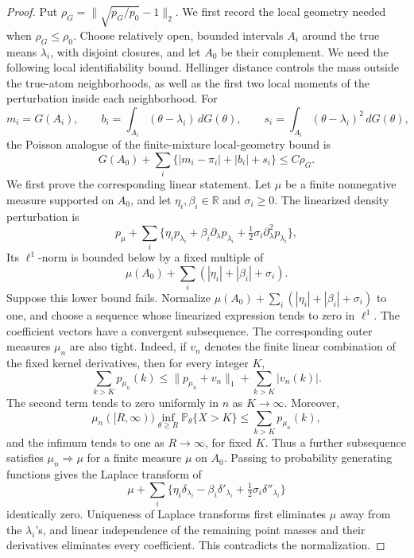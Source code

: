 \documentclass[11pt]{article}
\theoremstyle{definition}
\numberwithin{equation}{section}
\begin{document}
\begin{proof}
Put \(\rho_G=\|\sqrt{p_G/p_0}-1\|_2\). We first record the local geometry
needed when \(\rho_G\le\rho_0\). Choose relatively open, bounded intervals
\(A_i\) around the true means \(\lambda_i\), with disjoint closures, and let
\(A_0\) be their complement.
We need the following local identifiability bound. Hellinger distance
controls the mass outside the true-atom neighborhoods, as well as the first
two local moments of the perturbation inside each neighborhood. For
\[
 m_i=G(A_i),\qquad
 b_i=\int_{A_i}(\theta-\lambda_i)\,dG(\theta),\qquad
 s_i=\int_{A_i}(\theta-\lambda_i)^2\,dG(\theta),
\]
the Poisson analogue of the finite-mixture local-geometry bound is
\begin{equation}
\label{eq:poisson-local-geometry}
 G(A_0)+\sum_i\{|m_i-\pi_i|+|b_i|+s_i\}\le C\rho_G.
\end{equation}
We first prove the corresponding linear statement. Let \(\mu\) be a finite
nonnegative measure supported on \(A_0\), and let
\(\eta_i,\beta_i\in\mathbb R\) and \(\sigma_i\ge0\). The linearized density
perturbation is
\[
 p_\mu+\sum_i\{\eta_i p_{\lambda_i}
 +\beta_i\partial_\lambda p_{\lambda_i}
 +\tfrac12\sigma_i\partial_\lambda^2p_{\lambda_i}\},
\]
Its \(\ell^1\)-norm is bounded below by a fixed multiple of
\[
 \mu(A_0)+\sum_i(|\eta_i|+|\beta_i|+\sigma_i).
\]
Suppose this lower bound fails. Normalize
\(\mu(A_0)+\sum_i(|\eta_i|+|\beta_i|+\sigma_i)\) to one, and choose a
sequence whose linearized expression
tends to zero in \(\ell^1\). The coefficient vectors have a convergent
subsequence. The corresponding outer measures \(\mu_n\) are also tight.
Indeed, if \(v_n\)
denotes the finite linear combination of the fixed kernel derivatives, then
for every integer \(K\),
\[
 \sum_{k>K}p_{\mu_n}(k)
 \le \|p_{\mu_n}+v_n\|_1+\sum_{k>K}|v_n(k)|.
\]
The second term tends to zero uniformly in \(n\) as \(K\to\infty\).
Moreover,
\[
 \mu_n([R,\infty))\inf_{\theta\ge R}
       \mathbb P_\theta\{X>K\}
 \le \sum_{k>K}p_{\mu_n}(k),
\]
and the infimum tends to one as \(R\to\infty\), for fixed \(K\).
Thus a further subsequence satisfies \(\mu_n\Rightarrow\mu\) for a finite
measure \(\mu\) on \(A_0\). Passing to probability generating functions
gives the Laplace transform of
\[
 \mu+\sum_i\{\eta_i\delta_{\lambda_i}
 -\beta_i\delta'_{\lambda_i}
 +\tfrac12\sigma_i\delta''_{\lambda_i}\}
\]
identically zero. Uniqueness of Laplace transforms first eliminates \(\mu\)
away from the \(\lambda_i\)'s, and linear independence of the remaining
point masses and their derivatives eliminates every coefficient. This
contradicts the normalization.


\end{proof}
\end{document}
